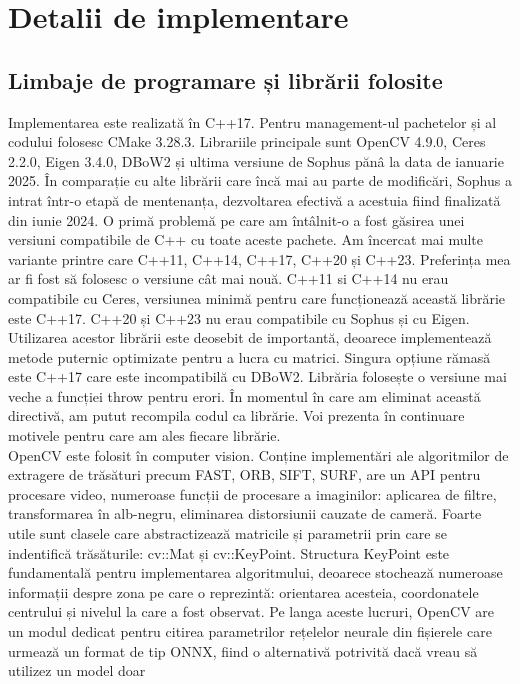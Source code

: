 \documentclass[12pt,a4paper]{report}
\begin{document}
\chapter{Detalii de implementare}
\section{Limbaje de programare și librării folosite}
Implementarea este realizată în C++17. Pentru management-ul pachetelor și al codului folosesc
CMake 3.28.3. Librariile principale sunt OpenCV\cite{itseez2015opencv} 4.9.0,
Ceres\cite{CeresSolver} 2.2.0, Eigen 3.4.0, DBoW2\cite{bagofwordslibrary} și ultima versiune de Sophus
pănâ la data de ianuarie 2025. În comparație cu alte librării care încă mai au parte de modificări,
Sophus a intrat într-o etapă de mentenanța, dezvoltarea efectivă a acestuia fiind finalizată din iunie 2024.
O primă problemă pe care am întâlnit-o a fost găsirea 
unei versiuni compatibile de C++ cu toate aceste pachete. Am încercat mai multe variante printre 
care C++11, C++14, C++17, C++20 și C++23. Preferința mea ar fi fost să folosesc o versiune cât mai nouă.
C++11 si C++14 nu erau compatibile cu Ceres, versiunea minimă pentru care funcționează această librărie
este C++17. C++20 și C++23 nu erau compatibile cu Sophus și cu Eigen. Utilizarea acestor librării este deosebit 
de importantă, deoarece implementează metode puternic optimizate pentru a lucra cu matrici.\@ 
Singura opțiune rămasă este C++17 care este incompatibilă cu DBoW2. Librăria 
folosește o versiune mai veche a funcției throw pentru erori. În momentul în care am eliminat această
directivă, am putut recompila codul ca librărie. Voi prezenta în continuare motivele pentru care 
am ales fiecare librărie. \\
OpenCV este folosit în computer vision. Conține implementări ale algoritmilor de extragere de
trăsături precum FAST, ORB, SIFT, SURF, are un API pentru procesare video, numeroase funcții de procesare
a imaginilor: aplicarea de filtre, transformarea în alb-negru, eliminarea distorsiunii
cauzate de cameră. Foarte utile sunt clasele care abstractizează matricile și parametrii 
prin care se indentifică trăsăturile: cv::Mat și cv::KeyPoint. Structura KeyPoint este 
fundamentală pentru implementarea algoritmului, deoarece stochează numeroase informații despre zona
pe care o reprezintă: orientarea acesteia, coordonatele centrului și nivelul la care a fost observat. 
Pe langa aceste lucruri, OpenCV are un modul dedicat pentru citirea parametrilor rețelelor neurale din fișierele care 
urmează un format de tip ONNX, fiind o alternativă potrivită dacă vreau să utilizez un model doar 
\end{document}
